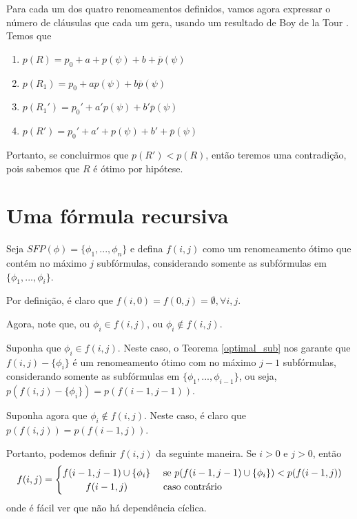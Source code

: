 Para cada um dos quatro renomeamentos definidos, vamos agora expressar o número de cláusulas que cada um gera, usando um resultado de Boy de la Tour \cite{de1992optimality}. Temos que
\begin{enumerate}
	\item $p(R) = p_0 + a + p(\psi) + b + \overline{p}(\psi)$
	\item $p(R_1) = p_0 + a p(\psi) + b \overline{p}(\psi)$
	\item $p(R_1') = p_0' + a' p(\psi) + b' \overline{p}(\psi)$
	\item $p(R') = p_0' + a' + p(\psi) + b' + \overline{p}(\psi)$
\end{enumerate}




Portanto, se concluirmos que $p(R') < p(R)$, então teremos uma contradição, pois sabemos que $R$ é ótimo por hipótese.

\section{Uma fórmula recursiva}

\indent

Seja $SFP(\phi) = \{\phi_1,...,\phi_n \}$ e defina $f(i,j)$ como um renomeamento ótimo que contém no máximo $j$ subfórmulas, considerando somente as subfórmulas em $\{\phi_1,...,\phi_i \}$.

Por definição, é claro que $f(i,0) = f(0,j) = \emptyset, \forall i,j$.

Agora, note que, ou $\phi_i \in f(i,j)$, ou $\phi_i \notin f(i,j)$.

Suponha que $\phi_i \in f(i,j)$. Neste caso, o Teorema \ref{optimal_sub} nos garante que $f(i,j) - \{\phi_i \}$ é um renomeamento ótimo com no máximo $j-1$ subfórmulas, considerando somente as subfórmulas em $\{\phi_1,...,\phi_{i-1} \}$, ou seja, $p(f(i,j) - \{\phi_i \}) = p(f(i-1,j-1))$.

Suponha agora que $\phi_i \notin f(i,j)$. Neste caso, é claro que $p(f(i,j)) = p(f(i-1,j))$.

Portanto, podemos definir $f(i,j)$ da seguinte maneira. Se $i > 0$ e $j > 0$, então
\[
f(i,j) =
\begin{cases} 
\hfill f(i-1,j-1) \cup \{\phi_i \}   \hfill & \text{ se } p(f(i-1,j-1) \cup \{\phi_i \}) < p(f(i-1,j)) \\
\hfill f(i-1,j) \hfill & \text{ caso contrário} \\
\end{cases}
\]
onde é fácil ver que não há dependência cíclica.

